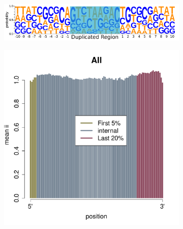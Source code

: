 \documentclass[12pt,letterpaper]{article}
\begin{document}
\begin{figure}
\begin{subfigure}{.49\textwidth}
  \caption{}
  \label{fig:GC-bias}
\end{subfigure}
\begin{subfigure}{\textwidth}
  \centering
  \includegraphics[scale=0.6]{100logo-prob-edited.pdf}
  \caption{}
  \label{fig:logos}
\end{subfigure}
\begin{subfigure}{.49\textwidth}
  \centering
  \includegraphics[scale=0.25, page=2]{insertion-position-bias.pdf}
  \caption{}
  \label{fig:insertion-position-bias-ess}
\end{subfigure}
\begin{subfigure}{.49\textwidth}
  \centering

\end{subfigure}
\end{figure}
\end{document}
